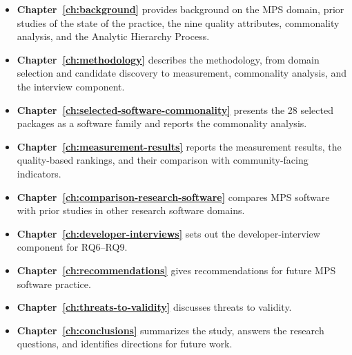 \begin{itemize}
    \item \textbf{Chapter~\ref{ch:background}} provides background on the MPS domain, prior studies of the state of the practice, the nine quality attributes, commonality analysis, and the Analytic Hierarchy Process.
    \item \textbf{Chapter~\ref{ch:methodology}} describes the methodology, from domain selection and candidate discovery to measurement, commonality analysis, and the interview component.
    \item \textbf{Chapter~\ref{ch:selected-software-commonality}} presents the 28 selected packages as a software family and reports the commonality analysis.
    \item \textbf{Chapter~\ref{ch:measurement-results}} reports the measurement results, the quality-based rankings, and their comparison with community-facing indicators.
    \item \textbf{Chapter~\ref{ch:comparison-research-software}} compares MPS software with prior studies in other research software domains.
    \item \textbf{Chapter~\ref{ch:developer-interviews}} sets out the developer-interview component for RQ6--RQ9.
    \item \textbf{Chapter~\ref{ch:recommendations}} gives recommendations for future MPS software practice.
    \item \textbf{Chapter~\ref{ch:threats-to-validity}} discusses threats to validity.
    \item \textbf{Chapter~\ref{ch:conclusions}} summarizes the study, answers the research questions, and identifies directions for future work.
\end{itemize}

